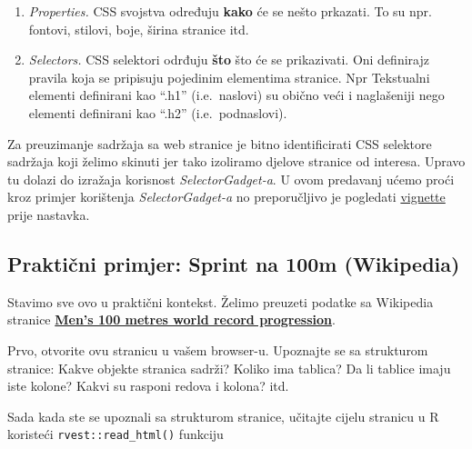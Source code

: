 \documentclass[
]{article}
\newenvironment{Shaded}{\begin{snugshade}}{\end{snugshade}}
\newcommand{\CommentTok}[1]{\textcolor[rgb]{0.56,0.35,0.01}{\textit{#1}}}
\newcommand{\KeywordTok}[1]{\textcolor[rgb]{0.13,0.29,0.53}{\textbf{#1}}}
\newcommand{\NormalTok}[1]{#1}
\newcommand{\StringTok}[1]{\textcolor[rgb]{0.31,0.60,0.02}{#1}}
\providecommand{\tightlist}{%
  \setlength{\itemsep}{0pt}\setlength{\parskip}{0pt}}
\begin{document}
\begin{enumerate}
\def\labelenumi{\arabic{enumi}.}
\tightlist
\item
  \emph{Properties.} CSS svojstva određuju \textbf{kako} će se nešto
  prkazati. To su npr. fontovi, stilovi, boje, širina stranice itd.
\item
  \emph{Selectors.} CSS selektori odrđuju \textbf{što} što će se
  prikazivati. Oni definirajz pravila koja se pripisuju pojedinim
  elementima stranice. Npr Tekstualni elementi definirani kao ``.h1''
  (i.e.~naslovi) su obično veći i naglašeniji nego elementi definirani
  kao ``.h2'' (i.e.~podnaslovi).
\end{enumerate}

Za preuzimanje sadržaja sa web stranice je bitno identificirati CSS
selektore sadržaja koji želimo skinuti jer tako izoliramo djelove
stranice od interesa. Upravo tu dolazi do izražaja korisnost
\emph{SelectorGadget-a}. U ovom predavanj ućemo proći kroz primjer
korištenja \emph{SelectorGadget-a} no preporučljivo je pogledati
\href{https://cran.r-project.org/web/packages/rvest/vignettes/selectorgadget.html}{vignette}
prije nastavka.

\hypertarget{praktiux10dni-primjer-sprint-na-100m-wikipedia}{%
\subsection{Praktični primjer: Sprint na 100m
(Wikipedia)}\label{praktiux10dni-primjer-sprint-na-100m-wikipedia}}

Stavimo sve ovo u praktični kontekst. Želimo preuzeti podatke sa
Wikipedia stranice
\href{http://en.wikipedia.org/wiki/Men\%27s_100_metres_world_record_progression}{\textbf{Men's
100 metres world record progression}}.

Prvo, otvorite ovu stranicu u vašem browser-u. Upoznajte se sa
strukturom stranice: Kakve objekte stranica sadrži? Koliko ima tablica?
Da li tablice imaju iste kolone? Kakvi su rasponi redova i kolona? itd.

Sada kada ste se upoznali sa strukturom stranice, učitajte cijelu
stranicu u R koristeći \texttt{rvest::read\_html()} funkciju

\begin{Shaded}
\end{Shaded}
\end{document}
